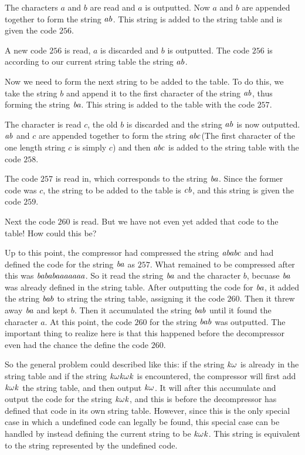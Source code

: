 The characters $a$ and $b$ are read and $a$ is outputted. Now $a$ and
$b$ are appended together to form the string $\mathit{ab}$. This string is
added to the string table and is given the code $256$.

A new code $256$ is read, $a$ is discarded and $b$ is outputted. The
code $256$ is according to our current string table the string
$\mathit{ab}$.

Now we need to form the next string to be added to the table. To do
this, we take the string $b$ and append it to the first character of
the string $\mathit{ab}$, thus forming the string $\mathit{ba}$. This string is added to
the table with the code $257$.

The character is read $c$, the old $b$ is discarded and the string
$\mathit{ab}$ is now outputted. $\mathit{ab}$ and $c$ are appended together
to form the string $\mathit{abc}$(The first character of the one length
string $c$ is simply $c$) and then $\mathit{abc}$ is added to the string
table with the code $258$.

The code $257$ is read in, which corresponds to the string
$\mathit{ba}$. Since the former code was $c$, the string to be added to
the table is $\mathit{cb}$, and this string is given the code $259$.

Next the code $260$ is read. But we have not even yet added that code
to the table! How could this be?

Up to this point, the compressor had compressed the string
$\mathit{ababc}$ and had defined the code for the string $\mathit{ba}$ as
$257$. What remained to be compressed after this was
$\mathit{bababaaaaaaa}$. So it read the string $\mathit{ba}$ and the
character $b$, becuase $\mathit{ba}$ was already defined in the string
table. After outputting the code for $\mathit{ba}$, it added the string
$\mathit{ba}b$ to string the string table, assigning it the code
$260$. Then it threw away $\mathit{ba}$ and kept $b$. Then it accumulated
the string $\mathit{bab}$ until it found the character $a$. At this
point, the code $260$ for the string $\mathit{bab}$ was outputted.  The
important thing to realize here is that this happened before the
decompressor even had the chance the define the code $260$.

\newcommand{\ko}{\ensuremath{\var{k\omega}}\xspace}
\newcommand{\kok}{\ensuremath{\var{\ko k}}\xspace}
\newcommand{\kokok}{\ensuremath{\var{\kok \omega k}}\xspace}

So the general problem could described like this\cite{welch85:_u}: if
the string \ko is already in the string table and if the string \kokok
is encountered, the compressor will first add \kok the string table,
and then output \ko. It will after this accumulate and output the code
for the string \kok, and this is before the decompressor has defined
that code in its own string table. However, since this is the only
special case in which a undefined code can legally be found, this
special case can be handled by instead defining the current string to
be $\kok$. This string is equivalent to the string represented by the
undefined code.

